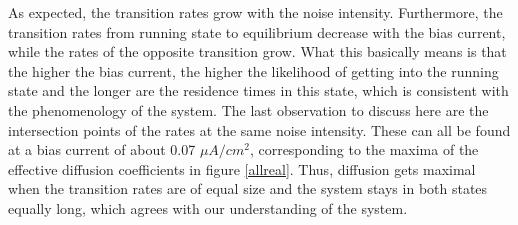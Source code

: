 \documentclass[12pt,a4paper]{article}
\begin{document}
As expected, the transition rates grow with the noise intensity. Furthermore, the transition rates from running state to equilibrium decrease with the bias current, while the rates of the opposite transition grow. What this basically means is that the higher the bias current, the higher the likelihood of getting into the running state and the longer are the residence times in this state, which is consistent with the phenomenology of the system. The last observation to discuss here are the intersection points of the rates at the same noise intensity. These can all be found at a bias current of about 0.07 $\mu A/cm^2$, corresponding to the maxima of the effective diffusion coefficients in figure \ref{allreal}. Thus, diffusion gets maximal when the transition rates are of equal size and the system stays in both states equally long, which agrees with our understanding of the system.
\end{document}
